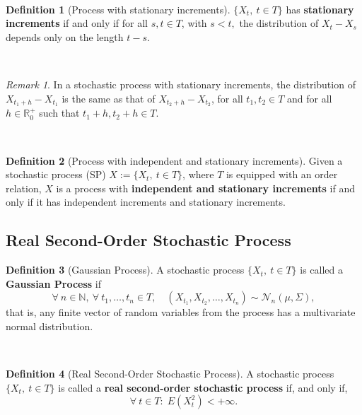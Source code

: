\documentclass[
  11pt,
  a4paper,
]{book}
\theoremstyle{definition}
\newtheorem{definition}{Definition}[chapter]
\theoremstyle{definition}
\theoremstyle{definition}
\theoremstyle{definition}
\theoremstyle{remark}
\newtheorem*{remark}{Remark}
\begin{document}
\(\,\)

\begin{definition}[Process with stationary increments]
\(\{X_t, ~ t \in T\}\) has \textbf{stationary increments} if and only if for all \(s, t \in T\), with \(s < t,\) the distribution of \(X_t - X_s\) depends only on the length \(t - s\).
\end{definition}

\(\,\)

\begin{remark}
In a stochastic process with stationary increments, the distribution of \(X_{t_1 + h} - X_{t_1}\) is the same as that of
\(X_{t_2 + h} - X_{t_2}\), for all \(t_1, t_2 \in T\) and for all \(h \in \mathbb{R}_0^+\) such that \(t_1 + h, t_2 + h \in T\).
\end{remark}

\(\,\)

\begin{definition}[Process with independent and stationary increments]
Given a stochastic process (SP) \(X := \{X_t, ~ t \in T\}\), where \(T\) is equipped with an order relation, \(X\) is a process with \textbf{independent and stationary increments} if and only if it has independent increments and stationary increments.
\end{definition}

\subsection{Real Second-Order Stochastic Process}\label{real-second-order-stochastic-process}

\begin{definition}[Gaussian Process]
A stochastic process \(\{X_t, ~t \in T\}\) is called a \textbf{Gaussian Process} if
\[
\forall ~n \in \mathbb{N},~ \forall ~t_1, \ldots, t_n \in T, \quad (X_{t_1}, X_{t_2}, \ldots, X_{t_n}) \sim \mathcal{N}_n(\mu, \Sigma),
\]
that is, any finite vector of random variables from the process has a multivariate normal distribution.
\end{definition}

\(\,\)

\begin{definition}[Real Second-Order Stochastic Process]
A stochastic process \(\{X_t, ~ t \in T\}\) is called a \textbf{real second-order stochastic process} if, and only if,
\[
\forall ~t \in T: \; E\!\left(X_t^2\right) < +\infty.
\]
\end{definition}
\end{document}
